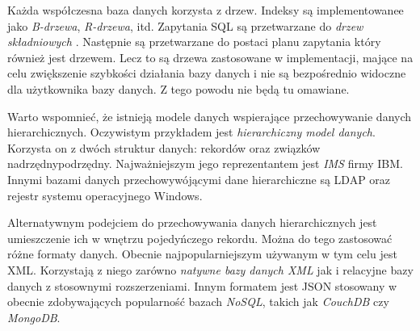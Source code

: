 Każda współczesna baza danych korzysta z drzew. 
Indeksy są implementowanee jako \emph{B-drzewa}, \emph{R-drzewa}, itd.
Zapytania SQL są przetwarzane do \emph{drzew składniowych} . Następnie są przetwarzane do postaci planu zapytania który również jest drzewem.
Lecz to są drzewa zastosowane w implementacji, mające na celu zwiększenie szybkości działania bazy danych i nie są bezpośrednio widoczne dla użytkownika bazy danych.
Z tego powodu nie będą tu omawiane.

Warto wspomnieć, że istnieją modele danych wspierające przechowywanie danych hierarchicznych.
Oczywistym przykładem jest \emph{hierarchiczny model danych}.
Korzysta on z dwóch struktur danych: rekordów oraz związków nadrzędny\dywiz{}podrzędny.
Najważniejszym jego reprezentantem jest \emph{IMS}  firmy IBM.
Innymi bazami danych przechowywójącymi dane hierarchiczne są LDAP  oraz rejestr systemu operacyjnego Windows.

Alternatywnym podejciem do przechowywania danych hierarchicznych jest umieszczenie ich w wnętrzu pojedyńczego rekordu.
Można do tego zastosować różne formaty danych.
Obecnie najpopularniejszym używanym w tym celu jest XML.
Korzystają z niego zarówno \emph{natywne bazy danych XML}  jak i relacyjne bazy danych z stosownymi rozszerzeniami.
Innym formatem jest JSON stosowany w obecnie zdobywających popularność bazach \emph{NoSQL}, takich jak \emph{CouchDB} czy \emph{MongoDB}. 






%












